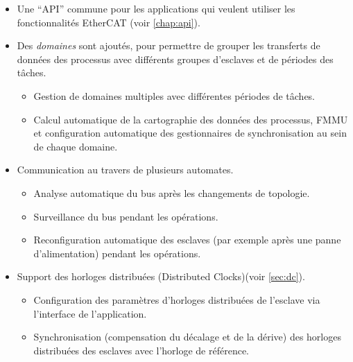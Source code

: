 \documentclass[a4paper,12pt,BCOR6mm,bibtotoc,idxtotoc]{scrbook}
\begin{document}
\begin{itemize}
\item Une ``API'' commune pour les applications qui veulent utiliser
  les fonctionnalit\'es EtherCAT (voir \autoref{chap:api}).

\item Des \textit{domaines} sont ajout\'es, pour permettre de grouper
  les transferts de donn\'ees des processus avec diff\'erents groupes
  d'esclaves et de p\'eriodes des t\^aches.


  \begin{itemize}

  \item Gestion de domaines multiples avec diff\'erentes p\'eriodes de
    t\^aches.

  \item Calcul automatique de la cartographie des donn\'ees des
    processus, FMMU et configuration automatique des gestionnaires de
    synchronisation au sein de chaque domaine.

  \end{itemize}

\item Communication au travers de plusieurs automates.

  \begin{itemize}

  \item Analyse automatique du bus apr\`es les changements de topologie.

  \item Surveillance du bus pendant les op\'erations.

  \item Reconfiguration automatique des esclaves (par exemple apr\`es
    une panne d'alimentation) pendant les op\'erations.

  \end{itemize}

\item Support des horloges distribu\'ees (Distributed Clocks)(voir
  \autoref{sec:dc}).

  \begin{itemize}

  \item Configuration des param\`etres d'horloges distribu\'ees de
    l'esclave via l'interface de l'application.

  \item Synchronisation (compensation du d\'ecalage et de la d\'erive)
    des horloges distribu\'ees des esclaves avec l'horloge de
    r\'ef\'erence.


\end{itemize}
\end{itemize}
\end{document}
